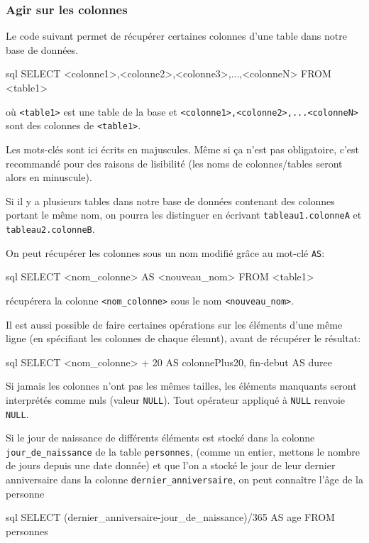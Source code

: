 \documentclass[a4paper]{scrartcl}
\begin{document}
			\subsubsection{Agir sur les colonnes}
				\semidef Le code suivant permet de récupérer certaines colonnes d'une table dans notre base de données.
				\begin{code}{sql}
					SELECT <colonne1>,<colonne2>,<colonne3>,...,<colonneN>
					FROM <table1>
				\end{code}
				où \texttt{<table1>} est une table de la base et \texttt{<colonne1>,<colonne2>,...<colonneN>} sont des colonnes de \texttt{<table1>}.

				\rem Les mots-clés sont ici écrits en majuscules. Même si ça n'est pas obligatoire, c'est recommandé pour des raisons de lisibilité
				(les noms de colonnes/tables seront alors en minuscule).
				
				\rem Si il y a plusieurs tables dans notre base de données contenant des colonnes portant le même nom,
				on pourra les distinguer en écrivant \texttt{tableau1.colonneA} et \texttt{tableau2.colonneB}.
				
				\semidef On peut récupérer les colonnes sous un nom modifié grâce au mot-clé \texttt{AS}:
				\begin{code}{sql} 
					SELECT <nom_colonne> AS <nouveau_nom>
					FROM <table1>
				\end{code}
				récupérera la colonne \texttt{<nom\_colonne>} sous le nom \texttt{<nouveau\_nom>}.

				Il est aussi possible de faire certaines opérations sur les éléments d'une même ligne (en spécifiant les colonnes de chaque élemnt), avant de récupérer le résultat:
				\begin{code}{sql}
					SELECT <nom_colonne> + 20 AS colonnePlus20, fin-debut AS duree
				\end{code}

				\rem Si jamais les colonnes n'ont pas les mêmes tailles, les éléments manquants seront interprétés comme nuls (valeur \texttt{NULL}).
				Tout opérateur appliqué à \texttt{NULL} renvoie \texttt{NULL}.

				\exemple Si le jour de naissance de différents éléments est stocké dans la colonne \texttt{jour\_de\_naissance} de la table \texttt{personnes},
				(comme un entier, mettons le nombre de jours depuis une date donnée)
				et que l'on a stocké le jour de leur dernier anniversaire dans la colonne \texttt{dernier\_anniversaire},
				on peut connaître l'âge de la personne
				\begin{code}{sql}
					SELECT (dernier_anniversaire-jour_de_naissance)/365 AS age
					FROM personnes 
				\end{code}
\end{document}
